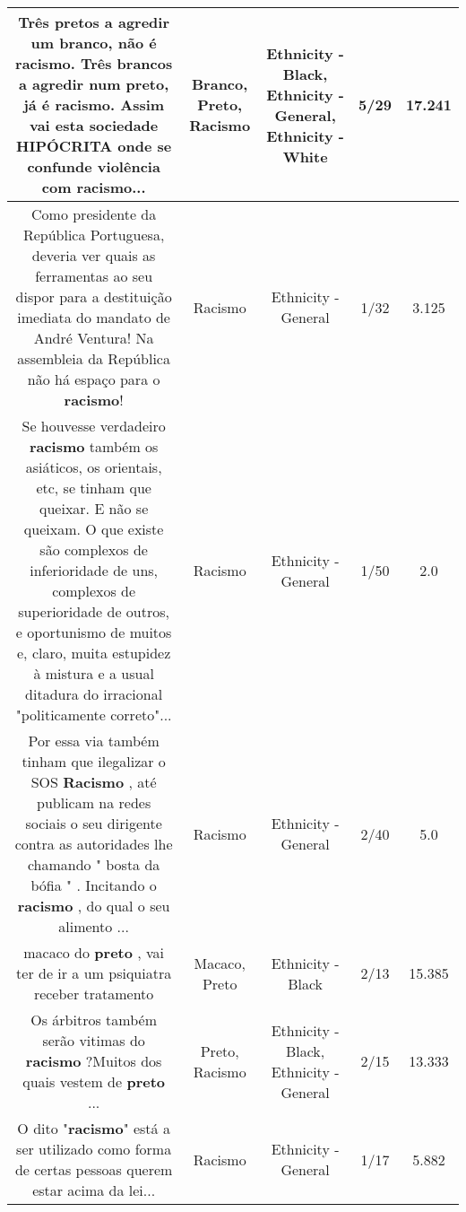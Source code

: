\documentclass[11pt]{article}
\newlength\mylength
\begin{document}
\begin{center}
\begin{longtable}{|C{.65\mylength}|C{.30\mylength}|C{.12\mylength}|C{.12\mylength}|C{.12\mylength}|}
  \small Três pretos a agredir um \textbf{branco}, não é \textbf{racismo}. Três brancos a agredir num \textbf{preto}, já é \textbf{racismo}. Assim vai esta sociedade HIPÓCRITA onde se confunde violência com \textbf{racismo}...\normalsize   & Branco, Preto, Racismo & Ethnicity - Black, Ethnicity - General, Ethnicity - White & 5/29 & 17.241 \\  \hline
  \small Como presidente da República Portuguesa, deveria ver quais as ferramentas ao seu dispor para a destituição imediata do mandato de André Ventura! Na assembleia da República não há espaço para o \textbf{racismo}!\normalsize   & Racismo & Ethnicity - General & 1/32 & 3.125 \\  \hline
  \small Se houvesse verdadeiro \textbf{racismo} também os asiáticos, os orientais, etc, se tinham que queixar. E não se queixam. O que existe são complexos de inferioridade de uns, complexos de superioridade de outros, e oportunismo de muitos e, claro, muita estupidez à mistura e a usual ditadura do irracional "politicamente correto"...\normalsize   & Racismo & Ethnicity - General & 1/50 & 2.0 \\  \hline
  \small Por essa via também tinham que ilegalizar o SOS \textbf{Racismo} , até publicam na redes sociais o seu dirigente contra  as autoridades lhe chamando " bosta da bófia " . Incitando o \textbf{racismo} , do qual o seu alimento ...\normalsize   & Racismo & Ethnicity - General & 2/40 & 5.0 \\  \hline
  \small macaco do \textbf{preto} , vai ter de ir a um psiquiatra receber tratamento\normalsize   & Macaco, Preto & Ethnicity - Black & 2/13 & 15.385 \\  \hline
  \small Os árbitros também serão vitimas do \textbf{racismo} ?Muitos dos quais vestem de \textbf{preto} ...\normalsize   & Preto, Racismo & Ethnicity - Black, Ethnicity - General & 2/15 & 13.333 \\  \hline
  \small O dito "\textbf{racismo}" está a ser utilizado como forma de certas pessoas querem estar acima da lei...\normalsize   & Racismo & Ethnicity - General & 1/17 & 5.882 \\  \hline

\end{longtable}
\end{center}
\end{document}
